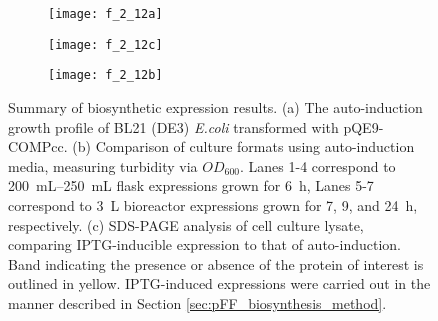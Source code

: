 \begin{refsection}
\begin{figure}[h!]
    \centering
    \begin{subfigure}[b]{0.3\textwidth}
        \texttt{[image: f\_2\_12a]}
        \caption{}
        \label{fig:AI_OD_curve}
    \end{subfigure}
    \begin{subfigure}[b]{0.3\textwidth}
        \texttt{[image: f\_2\_12c]}
        \caption{}
        \label{fig:bioreactor_OD_comparison}
    \end{subfigure}
    \begin{subfigure}[b]{0.3\textwidth}
        \texttt{[image: f\_2\_12b]}
        \caption{}
        \label{fig:AI_IPTG_gel} \end{subfigure}
    \caption{Summary of
        biosynthetic expression results. (a) The auto-induction growth profile
        of BL21 (DE3) \emph{E.coli} transformed with pQE9-COMPcc. (b) Comparison
        of culture formats using auto-induction media, measuring turbidity via
        ${OD_{600}}$. Lanes 1-4 correspond to \SIrange{200}{250}{\mL} flask
        expressions grown for \SI{6}{\hour}, Lanes 5-7 correspond to \SI{3}{\L}
        bioreactor expressions grown for 7, 9, and \SI{24}{\hour}, respectively.
    (c) SDS-PAGE analysis of cell culture lysate, comparing IPTG-inducible
expression to that of auto-induction. Band indicating the presence or absence of
the protein of interest is outlined in yellow. IPTG-induced expressions were
carried out in the manner described in Section
\ref{sec:pFF_biosynthesis_method}.}
\label{fig:expression_results}
\end{figure}


\end{refsection}
